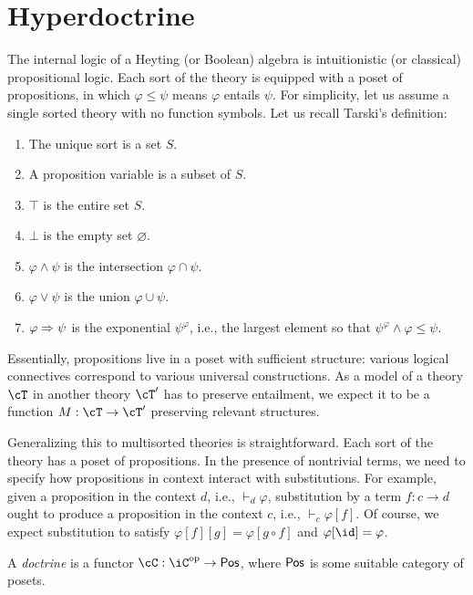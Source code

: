 \documentclass[article,10pt,oneside]{memoir}
\begin{document}
\section{Hyperdoctrine}
\label{sec:hyperdoctrine}

The internal logic of a Heyting (or Boolean) algebra is intuitionistic (or classical) propositional logic.
Each sort of the theory is equipped with a poset of propositions, in which $\varphi \leq \psi$ means $\varphi$ entails $\psi$.
For simplicity, let us assume a single sorted theory with no function symbols.
Let us recall Tarski's definition:
\begin{enumerate}
\item The unique sort is a set $S$.
\item A proposition variable is a subset of $S$.
\item $\top$ is the entire set $S$.
\item $\bot$ is the empty set $\varnothing$.
\item $\varphi \wedge \psi$ is the intersection $\varphi \cap \psi$.
\item $\varphi \vee \psi$ is the union $\varphi \cup \psi$.
\item $\varphi \Rightarrow \psi$ is the exponential $\psi^{\varphi}$, i.e., the largest element so that $\psi^{\varphi} \wedge \varphi \leq \psi$.
\end{enumerate}

Essentially, propositions live in a poset with sufficient structure: various logical connectives correspond to various universal constructions.
As a model of a theory $\cT$ in another theory $\cT'$ has to preserve entailment, we expect it to be a function $M : \cT \to \cT'$ preserving relevant structures.

Generalizing this to multisorted theories is straightforward.
Each sort of the theory has a poset of propositions.
In the presence of nontrivial terms, we need to specify how propositions in context interact with substitutions.
For example, given a proposition in the context $d$, i.e., $\vdash_{d} \varphi$, substitution by a term $f : c \to d$ ought to produce a proposition in the context $c$, i.e., $\vdash_{c} \varphi[f]$.
Of course, we expect substitution to satisfy $\varphi[f][g] = \varphi[g \circ f]$ and $\varphi[\id] = \varphi$.

\begin{defn}
  A \emph{doctrine} is a functor $\cC : \iC\op \to \CPos$, where $\mathsf{Pos}$ is some suitable category of posets.
\end{defn}
\end{document}
